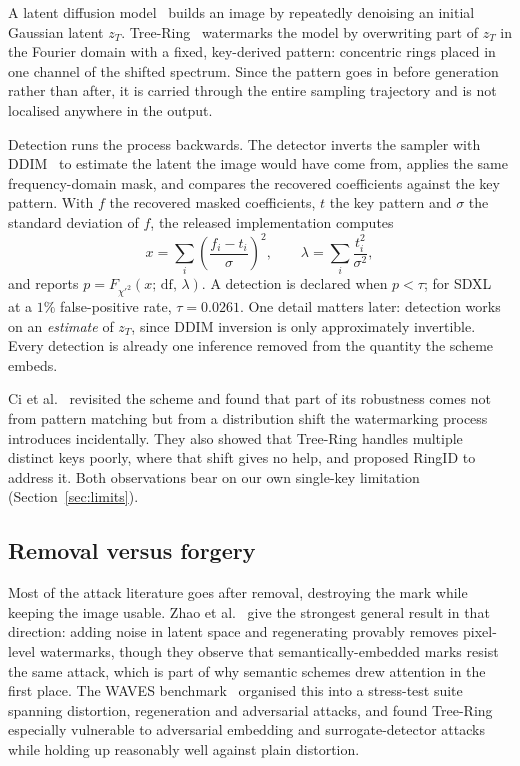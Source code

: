 \documentclass[10pt,twocolumn]{article}
\newcommand{\xstat}{\ensuremath{x}}
\newcommand{\lam}{\ensuremath{\lambda}}
\begin{document}
A latent diffusion model~\cite{rombach2022ldm,ho2020ddpm} builds an image by
repeatedly denoising an initial Gaussian latent $z_T$. Tree-Ring~\cite{wen2023treering} watermarks the
model by overwriting part of $z_T$ in the Fourier domain with a fixed, key-derived
pattern: concentric rings placed in one channel of the shifted spectrum. Since the
pattern goes in before generation rather than after, it is carried through the entire
sampling trajectory and is not localised anywhere in the output.

Detection runs the process backwards. The detector inverts the sampler with
DDIM~\cite{song2021ddim} to estimate the latent the image would have come from,
applies the same frequency-domain mask, and compares the recovered coefficients
against the key pattern. With $f$ the recovered masked coefficients, $t$ the key
pattern and $\sigma$ the standard deviation of $f$, the released implementation
computes
%
\begin{equation}
\xstat = \sum_i \left( \frac{f_i - t_i}{\sigma} \right)^{\!2},
\qquad
\lam = \sum_i \frac{t_i^{2}}{\sigma^{2}},
\label{eq:trstat}
\end{equation}
%
and reports $p = F_{\chi'^2}(\xstat;\, \mathrm{df},\, \lam)$. A detection is declared
when $p < \tau$; for SDXL~\cite{podell2024sdxl} at a $1\%$ false-positive rate,
$\tau = 0.0261$. One detail matters later: detection works on an \emph{estimate} of
$z_T$, since DDIM inversion is only approximately invertible. Every detection is
already one inference removed from the quantity the scheme embeds.

Ci et al.~\cite{ci2024ringid} revisited the scheme and found that part of its
robustness comes not from pattern matching but from a distribution shift the
watermarking process introduces incidentally. They also showed that Tree-Ring
handles multiple distinct keys poorly, where that shift gives no help, and proposed
RingID to address it. Both observations bear on our own single-key limitation
(Section~\ref{sec:limits}).

\subsection{Removal versus forgery}

Most of the attack literature goes after removal, destroying the mark while keeping
the image usable. Zhao et al.~\cite{zhao2024removable} give the strongest general
result in that direction: adding noise in latent space and regenerating provably
removes pixel-level watermarks, though they observe that semantically-embedded marks
resist the same attack, which is part of why semantic schemes drew attention in the
first place. The WAVES benchmark~\cite{an2024waves} organised this into a
stress-test suite spanning distortion, regeneration and adversarial attacks, and found
Tree-Ring especially vulnerable to adversarial embedding and surrogate-detector
attacks while holding up reasonably well against plain distortion.
\end{document}
